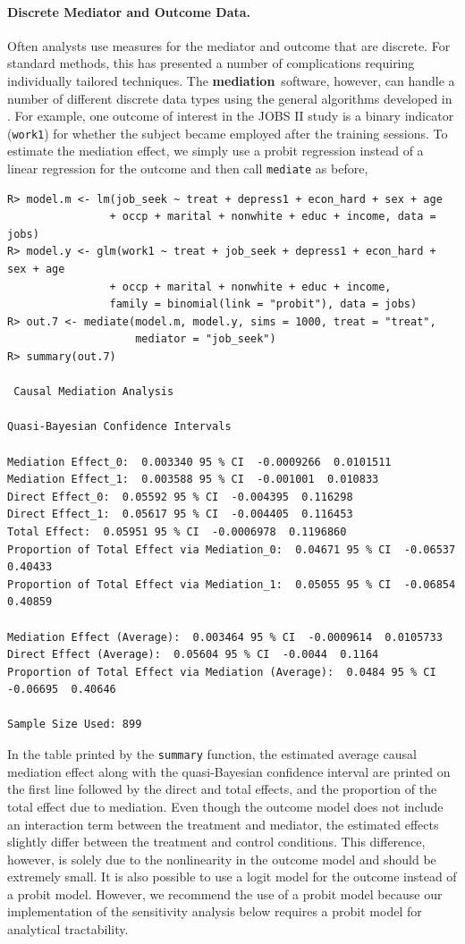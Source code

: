 \documentclass[11pt,letterpaper]{article}
\theoremstyle{plain}
\newcommand\bmediation{{\bf mediation}}
\begin{document}
\paragraph{Discrete Mediator and Outcome Data.}

Often analysts use measures for the mediator and outcome that are
discrete.  For standard methods, this has presented a number of
complications requiring individually tailored techniques.  The
\bmediation\ software, however, can handle a number of different
discrete data types using the general algorithms developed in
\citet{imai:keel:ting:10}.  For example, one outcome of interest in
the JOBS II study is a binary indicator (\texttt{work1}) for whether
the subject became employed after the training sessions. To estimate
the mediation effect, we simply use a probit regression instead of a
linear regression for the outcome and then call \texttt{mediate} as
before,
\begin{verbatim}
R> model.m <- lm(job_seek ~ treat + depress1 + econ_hard + sex + age 
                + occp + marital + nonwhite + educ + income, data = jobs)
R> model.y <- glm(work1 ~ treat + job_seek + depress1 + econ_hard + sex + age 
                + occp + marital + nonwhite + educ + income, 
                family = binomial(link = "probit"), data = jobs)
R> out.7 <- mediate(model.m, model.y, sims = 1000, treat = "treat",
                    mediator = "job_seek")
R> summary(out.7)

 Causal Mediation Analysis 

Quasi-Bayesian Confidence Intervals

Mediation Effect_0:  0.003340 95 % CI  -0.0009266  0.0101511 
Mediation Effect_1:  0.003588 95 % CI  -0.001001  0.010833 
Direct Effect_0:  0.05592 95 % CI  -0.004395  0.116298 
Direct Effect_1:  0.05617 95 % CI  -0.004405  0.116453 
Total Effect:  0.05951 95 % CI  -0.0006978  0.1196860 
Proportion of Total Effect via Mediation_0:  0.04671 95 % CI  -0.06537  0.40433 
Proportion of Total Effect via Mediation_1:  0.05055 95 % CI  -0.06854  0.40859 

Mediation Effect (Average):  0.003464 95 % CI  -0.0009614  0.0105733 
Direct Effect (Average):  0.05604 95 % CI  -0.0044  0.1164 
Proportion of Total Effect via Mediation (Average):  0.0484 95 % CI  -0.06695  0.40646 

Sample Size Used: 899 
\end{verbatim}

In the table printed by the \texttt{summary} function, the estimated
average causal mediation effect along with the quasi-Bayesian
confidence interval are printed on the first line followed by the
direct and total effects, and the proportion of the total effect due
to mediation.  Even though the outcome model does not include an interaction
term between the treatment and mediator, the estimated effects slightly differ
between the treatment and control conditions.  This difference, however, 
is solely due to the nonlinearity in the outcome model and should be
extremely small.  It is also possible to use a logit model for the
outcome instead of a probit model.  However, we recommend the use of a
probit model because our implementation of the sensitivity analysis
below requires a probit model for analytical tractability.
\end{document}
